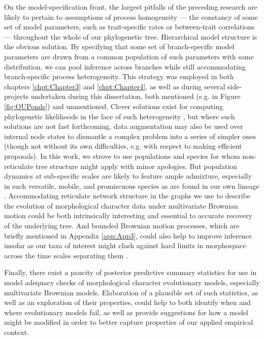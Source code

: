 On the model-specification front, the largest pitfalls of the preceding research are likely to pertain to assumptions of process homogeneity --- the constancy of some set of model parameters, such as trait-specific rates or between-trait correlations --- throughout the whole of our phylogenetic tree. Hierarchical model structure is the obvious solution. By specifying that some set of branch-specific model parameters are drawn from a common population of such parameters with some distribution, we can pool inference across branches while still accommodating branch-specific process heterogeneity. This strategy was employed in both chapters \ref{chpt:Chapter3} and \ref{chpt:Chapter4}, as well as during several side-projects undertaken during this dissertation, both mentioned (e.g. in Figure \ref{fig:OUPonds}) and unmentioned. Clever solutions exist for computing phylogenetic likelihoods in the face of such heterogeneity \citep[e.g.][]{caetanoEstimatingCorrelatedRates2019}, but where such solutions are not fast forthcoming, data augmentation may also be used over internal node states to dismantle a complex problem into a series of simpler ones (though not without its own difficulties, e.g. with respect to making efficient proposals). In this work, we strove to use populations and species for whom non-reticulate tree structure might apply with minor apologies. But population dynamics at sub-specific scales are likely to feature ample admixture, especially in such versatile, mobile, and promiscuous species as are found in our own lineage \citep{pruferCompleteGenomeSequence2014, durvasulaRecoveringSignalsGhost2020}. Accommodating reticulate network structure in the graphs we use to describe the evolution of morphological character data under multivariate Brownian motion \citep{pickrellInferencePopulationSplits2012, bastidePhylogeneticComparativeMethods2018} could be both intrinsically interesting and essential to accurate recovery of the underlying tree. And bounded Brownian motion processes, which are briefly mentioned in Appendix \ref{app:App3}, could also help to improve inference insofar as our taxa of interest might clash against hard limits in morphospace across the time scales separating them \citep{estesResolvingParadoxStasis2007}.

Finally, there exist a paucity of posterior predictive summary statistics \citep{gelmanPosteriorPredictiveAssessment1996} for use in model adequacy checks of morphological character evolutionary models, especially multivariate Brownian models. Elaboration of a plausible set of such statistics, as well as an exploration of their properties, could help to both identify when and where evolutionary models fail, as well as provide suggestions for how a model might be modified in order to better capture properties of our applied empirical context. 

